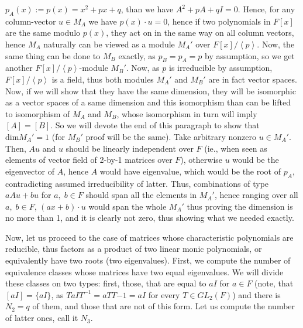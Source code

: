 \documentclass[8pt]{article} %
\begin{document}
\begin{enumerate}[label=\bfseries Problem \arabic*.]
{\begin{enumerate}[label=(\arabic*).]
{				$p_A(x):=p(x)=x^2+px+q$, than we have $A^2+pA+qI=0$. Hence, for any column-vector $u\in M_A$ we have $p(x)\cdot u=0$, hence
				if two polynomials in $F[x]$ are the same modulo $p(x)$, they act on in the same way on all column vectors,
				hence $M_A$ naturally can be viewed as a module $M_A'$ over $F[x]/\left<p\right>$. Now, the same thing can be done to $M_B$ exactly,
				as $p_B=p_A=p$ by assumption, so we get another $F[x]/\left<p\right>$-module $M_B'$. Now, as $p$ is irreducible by assumption, 
				$F[x]/\left<p\right>$ is a field, thus both modules $M_A'$ and $M_B'$ are in fact vector spaces. Now, if we will show that they
				have the same dimension, they will be isomorphic as a vector spaces of a same dimension and this isomorphism than can be lifted
				to isomorphism of $M_A$ and $M_B$, whose isomorphism in turn will imply $[A]=[B]$. So we will devote the end of this paragraph to
				show that $\mbox{dim}M_A'=1$ (for $M_B'$ proof will be the same). Take arbitrary nonzero
				$u\in M_A'$. Then, $Au$ and $u$ should be linearly independent over $F$ (ie., when seen as elements of vector field of 2-by-1
				matrices over $F$), otherwise $u$ would be the eigenvector of $A$, hence $A$ would have eigenvalue, which would be the root of $p_A$,
				contradicting assumed irreducibility of latter. Thus, combinations of type $aAu+bu$ for $a,\;b\in F$ should span all the elements
				in $M_A'$, hence ranging over all $a,\;b\in F$, $(ax+b)\cdot u$ would span the whole $M_A'$ thus proving the dimension is no more than
				1, and it is clearly not zero, thus showing what we needed exactly.

				Now, let us proceed to the case of matrices whose characteristic polynomials are reducible, thus factors as a product
				of two linear monic polynomials, or equivalently have two roots (two eigenvalues). First, we compute the number of equivalence
				classes whose matrices have two equal eigenvalues. We will divide these classes on two types: first, those, that are equal to $aI$
				for $a\in F$ (note, that $[aI]=\{aI\}$, as $TaIT^{-1}=aTT{-1}=aI$ for every $T\in GL_2(F)$) and there is $N_2=q$ of them, and those
				that are not of this form. Let us compute the number of latter ones, call it $N_3$.

}
\end{enumerate}}
\end{enumerate}
\end{document}
